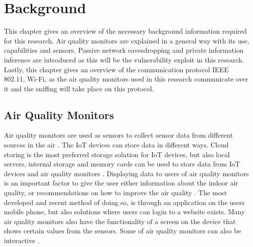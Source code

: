 \chapter{Background}
This chapter gives an overview of the necessary background information required for this research. Air quality monitors are explained in a general way with its use, capabilities and sensors. Passive network eavesdropping and private information inference are introduced as this will be the vulnerability exploit in this research. Lastly, this chapter gives an overview of the communication protocol IEEE 802.11, \gls{Wi-Fi}, as the air quality monitors used in this research communicate over it and the sniffing will take place on this protocol.

\section{Air Quality Monitors}
Air quality monitors are used as sensors to collect sensor data from different sources in the air \cite{GeneralAirQualityMonitor}. The \gls{IoT} devices can store data in different ways. Cloud storing is the most preferred storage solution for \gls{IoT} devices, but also local servers, internal storage and memory cards can be used to store data from \gls{IoT} devices and air quality monitors \cite{AQMBigSource}. Displaying data to users of air quality monitors is an important factor to give the user either information about the indoor air quality, or recommendations on how to improve the air quality \cite{AQMBigSource}. The most developed and recent method of doing so, is through an application on the users mobile phone, but also solutions where users can login to a website exists. Many air quality monitors also have the functionality of a screen on the device that shows certain values from the sensors. Some of air quality monitors can also be interactive \cite{AQMBigSource}.

